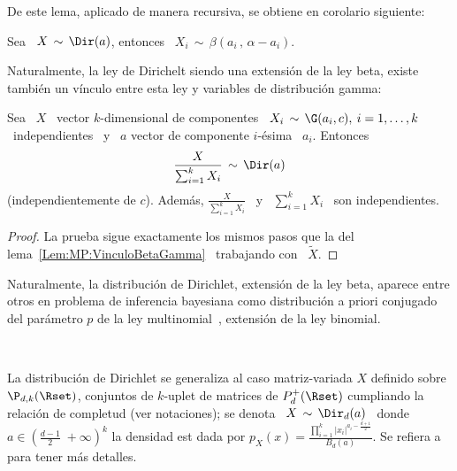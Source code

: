 De este lema, aplicado de manera recursiva, se obtiene en corolario siguiente:
%
\begin{corolario}
\label{Cor:MP:MarginalDirichletBeta}
%
  Sea  \ $X  \,  \sim \,  \Dir(a)$, entonces  \  $\displaystyle X_i  \, \sim  \,
  \beta\left( a_i \, , \, \alpha-a_i \right)$.
\end{corolario}

Naturalmente, la ley de Dirichelt siendo  una extensi\'on de la ley beta, existe
tambi\'en un v\'inculo entre esta ley y variables de distribuci\'on gamma:
%
\begin{lema}
\label{Lem:MP:VinculoDirichletGamma}
%
Sea \ $X$  \ vector $k$-dimensional de componentes \ $X_i  \, \sim \, \G(a_i,c),
\:  i  = 1,  \ldots  , k$  \  independientes  \ y  \  $a$  vector de  componente
$i$-\'esima \ $a_i$. Entonces
  \[
  \frac{X}{\sum_{i=1}^k X_i} \, \sim \, \Dir(a)
  \]
  (independientemente  de $c$).   Adem\'as, $\frac{X}{\sum_{i=1}^k  X_i}$ \  y \
  $\sum_{i=1}^k X_i$ \ son independientes.
\end{lema}
%
\begin{proof}
  La    prueba   sigue    exactamente   los    mismos   pasos    que    la   del
  lema~\ref{Lem:MP:VinculoBetaGamma} \ trabajando con \ $\widetilde{X}$.
\end{proof}

Naturalmente,  la  distribuci\'on de  Dirichlet,  extensi\'on  de  la ley  beta,
aparece entre  otros en problema  de inferencia bayesiana como  distribuci\'on a
priori  conjugado  del  par\'ametro  $p$  de  la  ley  multinomial~\cite{Rob07},
extensi\'on de la ley binomial.


\

La distribuci\'on de Dirichlet se generaliza al caso matriz-variada $X$ definido
sobre $\P_{d,k}(\Rset)$,  conjuntos de  $k$-uplet de matrices  de $P_d^+(\Rset)$
cumpliando la relaci\'on  de completud (ver notaciones); se denota  \ $X \, \sim
\, \Dir_d(a)$  \ donde \  $a \in \left(  \frac{d-1}{2} \; +\infty  \right)^k$ la
densidad  est dada por  $\displaystyle p_X(x)  = \frac{\prod_{i=1}^k  \left| x_i
  \right|^{a_i-\frac{d+1}{2}}}{B_d(a)}$.   Se  refiera a~\cite[Cap.~6]{GupNag99}
para tener m\'as detalles.